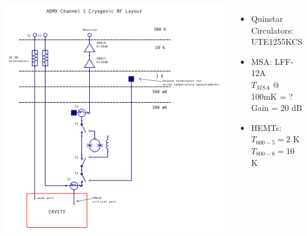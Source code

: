 \documentclass{beamer}
\begin{document}
\begin{frame}
\begin{columns}
\includegraphics[width=\textwidth]{export_cryo_layout_msa_text}
\begin{itemize}
\item {\tiny Quinstar Circulators: \\ UTE1255KCS}
\item {\tiny MSA: LFF-12A \\ $T_{MSA}$ @ 100mK = ? \\ Gain = 20 dB}
\item {\tiny HEMTs: \\ $T_{600-5} = 2$ K \\ $T_{800-8} = 10$ K}
\end{itemize}
\end{columns}
\end{frame}
\end{document}
